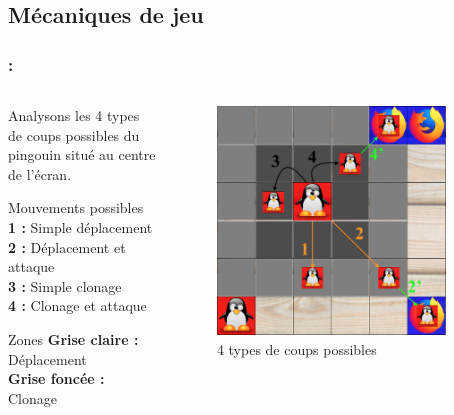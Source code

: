 \documentclass[9pt]{beamer}
\begin{document}
\subsection{Mécaniques de jeu}

\begin{frame}[fragile]
\frametitle{\insertsectionhead : \insertsubsectionhead}

\begin{columns}

\begin{column}{4cm}
\begin{center}
Analysons les 4 types de coups possibles du pingouin situé au centre de l'écran.
\vspace{10px}
\begin{block}{Mouvements possibles}
\textbf{1 :} Simple déplacement\\
\textbf{2 :} Déplacement et attaque\\
\textbf{3 :} Simple clonage\\
\textbf{4 :} Clonage et attaque\\
\end{block}
\begin{block}{Zones}
\textbf{Grise claire :} Déplacement\\
\textbf{Grise foncée :} Clonage\\
\end{block}
\end{center}
\end{column}

\begin{column}{7cm}
\begin{figure}[h]
        \begin{center}
            \includegraphics[width=0.9\textwidth]{figures/Situations.png}
            \caption{4 types de coups possibles}
        \end{center}
    \end{figure}
\end{column}

\end{columns}

\end{frame}
\end{document}
